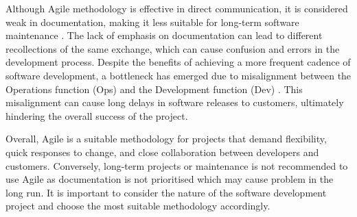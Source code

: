 Although Agile methodology is effective in direct communication, it is considered weak in documentation, making it less suitable for long-term software maintenance \cite{aaa, koch}. The lack of emphasis on documentation can lead to different recollections of the same exchange, which can cause confusion and errors in the development process. Despite the benefits of achieving a more frequent cadence of software development, a bottleneck has emerged due to misalignment between the Operations function (Ops) and the Development function (Dev) \cite{hlrf}. This misalignment can cause long delays in software releases to customers, ultimately hindering the overall success of the project.

Overall, Agile is a suitable methodology for projects that demand flexibility, quick responses to change, and close collaboration between developers and customers. Conversely, long-term projects or maintenance is not recommended to use Agile as documentation is not prioritised which may cause problem in the long run. It is important to consider the nature of the software development project and choose the most suitable methodology accordingly. 